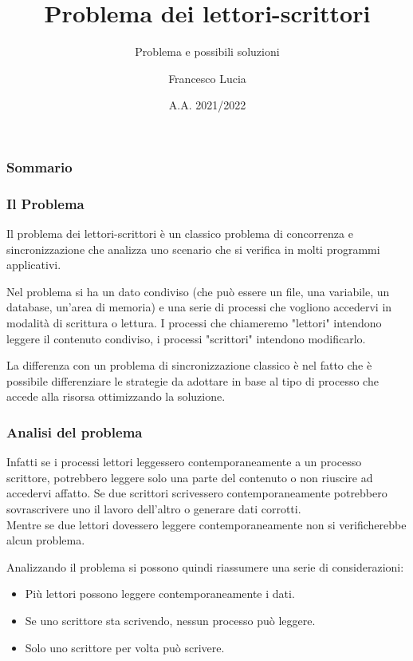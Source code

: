\documentclass{beamer}[10pt]
\title[Lettori-Scrittori]{Problema dei lettori-scrittori}
\subtitle{Problema e possibili soluzioni}
\author{Francesco Lucia}
\institute[]
{
	Università degli studi della Basilicata \\
	\medskip
}
\date{A.A. 2021/2022}
\begin{document}
	
	\begin{frame}
		\titlepage
	\end{frame}
	
	\begin{frame}
		\frametitle{Sommario}
		\tableofcontents
	\end{frame}
	
	\begin{frame}
		\frametitle{Il Problema}
		
		Il problema dei lettori-scrittori è un classico problema di concorrenza e sincronizzazione che analizza uno scenario che si verifica in molti programmi applicativi.
		
		Nel problema si ha un dato condiviso (che può essere un file, una variabile, un database, un'area di memoria) e una serie di processi che vogliono accedervi in modalità di scrittura o lettura. I processi che chiameremo "lettori" intendono leggere il contenuto condiviso, i processi "scrittori" intendono modificarlo.
	
		La differenza con un problema di sincronizzazione classico è nel fatto che è possibile differenziare le strategie da adottare in base al tipo di processo che accede alla risorsa ottimizzando la soluzione.
	\end{frame}

\begin{frame}
	\frametitle{Analisi del problema}
	
	Infatti se i processi lettori leggessero contemporaneamente a un processo scrittore, potrebbero leggere solo una parte del contenuto o non riuscire ad accedervi affatto. Se due scrittori scrivessero contemporaneamente potrebbero sovrascrivere uno il lavoro dell'altro o generare dati corrotti.\\Mentre se due lettori dovessero leggere contemporaneamente non si verificherebbe alcun problema.
	
	Analizzando il problema si possono quindi riassumere una serie di considerazioni:
	
	\begin{itemize}
		\item Più lettori possono leggere contemporaneamente i dati.
		\item Se uno scrittore sta scrivendo, nessun processo può leggere.
		\item Solo uno scrittore per volta può scrivere.
	\end{itemize}
\end{frame}
\end{document}
